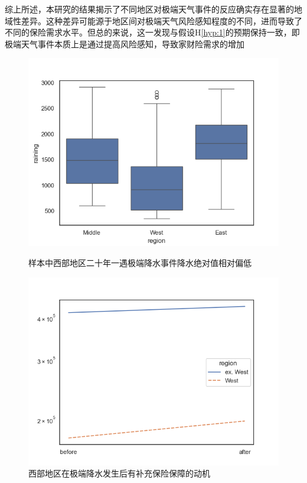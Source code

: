 综上所述，本研究的结果揭示了不同地区对极端天气事件的反应确实存在显著的地域性差异。这种差异可能源于地区间对极端天气风险感知程度的不同，进而导致了不同的保险需求水平。但总的来说，这一发现与假设H\ref{hyp:1}的预期保持一致，即极端天气事件本质上是通过提高风险感知，导致家财险需求的增加

\begin{figure}[htbp]
    \centering
    \begin{minipage}{0.48\linewidth}
        \includegraphics[width=\linewidth]{lib/img/rainings.png}
        \caption{样本中西部地区二十年一遇极端降水事件降水绝对值相对偏低}\label{fig:rainings}
    \end{minipage}
    \begin{minipage}{0.48\linewidth}
        \includegraphics[width=\linewidth]{lib/img/covbyregion.png}
        \caption{西部地区在极端降水发生后有补充保险保障的动机}
    \end{minipage}
\end{figure}

